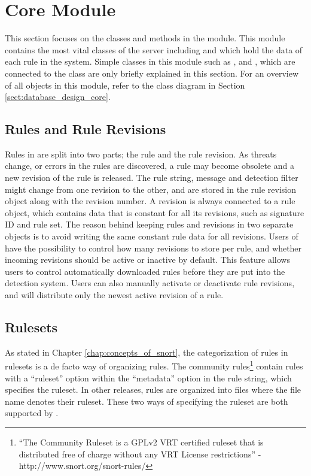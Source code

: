 \section{Core Module}
This section focuses on the classes and methods in the 
module. This module contains the most vital classes of the \snowman{} server
including  and  which hold the
data of each rule in the system. Simple classes in this module such as
,  and
, which are connected to the  class
are only briefly explained in this section. For an overview of all objects in
this module, refer to the class diagram in Section
\ref{sect:database_design_core}.

\subsection{Rules and Rule Revisions}
Rules in \snowman{} are split into two parts; the rule and the rule revision. As
threats change, or errors in the rules are discovered, a rule may become
obsolete and a new revision of the rule is released. The rule string, message
and detection filter might change from one revision to the other, and are stored in
the rule revision object along with the revision number. A revision is always
connected to a rule object, which contains data that is constant for all its
revisions, such as signature ID and rule set. The reason behind keeping rules
and revisions in two separate objects is to avoid writing the same constant rule
data for all revisions. Users of \snowman{} have the possibility to control how
many revisions to store per rule, and whether incoming revisions should be
active or inactive by default. This feature allows users to control
automatically downloaded rules before they are put into the detection
system. Users can also manually activate or deactivate rule revisions, and
\snowman{} will distribute only the newest active revision of a rule.

\subsection{Rulesets}
As stated in Chapter \ref{chap:concepts_of_snort}, the categorization of rules
in rulesets is a de facto way of organizing rules. The community
rules\footnote{``The Community Ruleset is a GPLv2 VRT certified ruleset that is
distributed free of charge without any VRT License restrictions'' -
http://www.snort.org/snort-rules/} contain rules with a ``ruleset'' option
within the ``metadata'' option in the rule string, which specifies the ruleset.
In other releases, rules are organized into files where the file name denotes
their ruleset. These two ways of specifying the ruleset are both supported by
\snowman{}.

